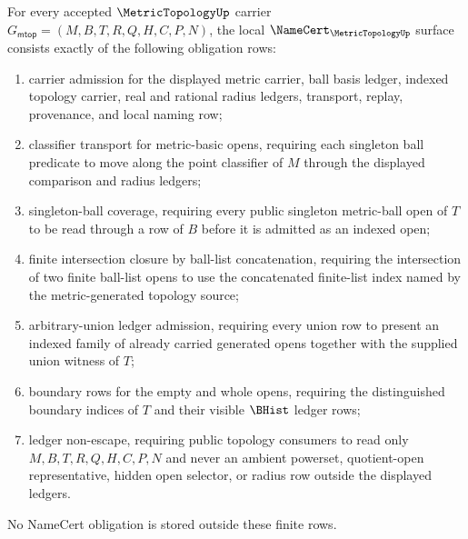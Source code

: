 \begin{theorem}
\label{thm:metric-topology-namecert-obligations}
For every accepted $\MetricTopologyUp$ carrier $G_{\mathsf{mtop}}=(M,B,T,R,Q,H,C,P,N)$, the local $\NameCert_{\MetricTopologyUp}$ surface consists exactly of the following obligation rows:
\begin{enumerate}
\item carrier admission for the displayed metric carrier, ball basis ledger, indexed topology carrier, real and rational radius ledgers, transport, replay, provenance, and local naming row;
\item classifier transport for metric-basic opens, requiring each singleton ball predicate to move along the point classifier of $M$ through the displayed comparison and radius ledgers;
\item singleton-ball coverage, requiring every public singleton metric-ball open of $T$ to be read through a row of $B$ before it is admitted as an indexed open;
\item finite intersection closure by ball-list concatenation, requiring the intersection of two finite ball-list opens to use the concatenated finite-list index named by the metric-generated topology source;
\item arbitrary-union ledger admission, requiring every union row to present an indexed family of already carried generated opens together with the supplied union witness of $T$;
\item boundary rows for the empty and whole opens, requiring the distinguished boundary indices of $T$ and their visible $\BHist$ ledger rows;
\item ledger non-escape, requiring public topology consumers to read only $M,B,T,R,Q,H,C,P,N$ and never an ambient powerset, quotient-open representative, hidden open selector, or radius row outside the displayed ledgers.
\end{enumerate}
No NameCert obligation is stored outside these finite rows.
\end{theorem}
